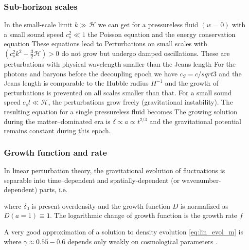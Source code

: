 \subsubsection{Sub-horizon scales}
In the small-scale limit $k\gg\mathcal{H}$ we can get for a pressureless fluid $(w=0)$ with a small sound speed $c_s^2\ll1$ the Poisson equation
and the energy conservation equation
These equations lead to
Perturbations on small scales with $(c_s^2k^2-\frac32\mathcal{H})>0$ do not grow but undergo damped oscillations. These are perturbations with physical wavelength smaller than the Jeans length
For the photons and baryons before the decoupling epoch we have $c_S=c/sqrt3$ and the Jeans length is comparable to the Hubble radius $H^{-1}$ and the growth of perturbations is prevented on all scales smaller than that. For a small sound speed $c_sl\ll\mathcal{H}$, the perturbations grow freely (gravitational instability). The resulting equation for a single pressureless fluid becomes
The growing solution during the matter--dominated era is $\delta\propto a\propto t^{2/3}$ and the gravitational potential remains constant during this epoch.

\subsubsection{Growth function and rate}
In linear perturbation theory, the gravitational evolution of fluctuations is separable into time--dependent and spatially-dependent (or wavenumber-dependent) parts, i.e.
\begin{sloppypar}
where $\delta_0$ is present overdensity and the growth function $D$ is normalized as ${D(a=1)\equiv1}$. The logarithmic change of growth function is the growth rate $f$
\end{sloppypar}
 A very good approximation of a solution to density evolution \eqref{eq:lin_evol_m} is
where $\gamma\approx0.55-0.6$ depends only weakly on cosmological parameters \parencite{1980_Peebles}.

